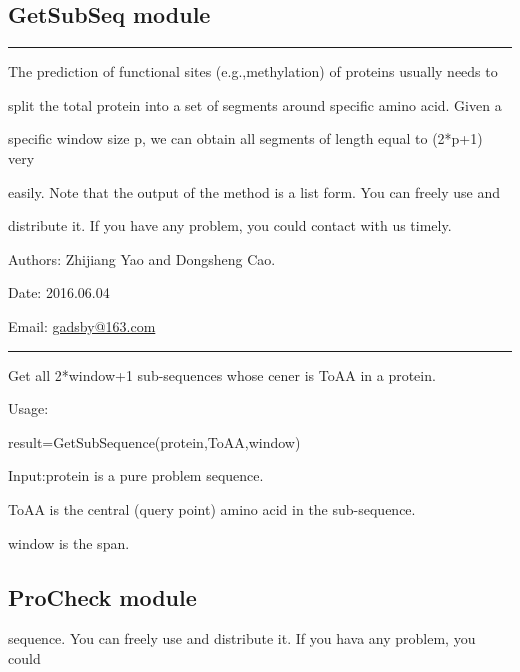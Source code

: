 \documentclass[letterpaper,10pt,english]{sphinxmanual}
\begin{document}
\subsection{GetSubSeq module}
\label{reference/GetSubSeq:module-GetSubSeq}\label{reference/GetSubSeq:getsubseq-module}\label{reference/GetSubSeq::doc}

\bigskip\hrule{}\bigskip


The prediction of functional sites (e.g.,methylation) of proteins usually needs to

split the total protein into a set of segments around specific amino acid. Given a

specific window size p, we can obtain all segments of length equal to (2*p+1) very

easily. Note that the output of the method is a list form. You can freely use and

distribute it. If you have any problem, you could contact with us timely.

Authors: Zhijiang Yao and Dongsheng Cao.

Date: 2016.06.04

Email: \href{mailto:gadsby@163.com}{gadsby@163.com}


\bigskip\hrule{}\bigskip


\begin{fulllineitems}
\label{reference/GetSubSeq:GetSubSeq.GetSubSequence}
Get all 2*window+1 sub-sequences whose cener is ToAA in a protein.

Usage:

result=GetSubSequence(protein,ToAA,window)

Input:protein is a pure problem sequence.

ToAA is the central (query point) amino acid in the sub-sequence.

window is the span.

\end{fulllineitems}



\subsection{ProCheck module}
\label{reference/ProCheck::doc}\label{reference/ProCheck:module-ProCheck}\label{reference/ProCheck:procheck-module}
sequence. You can freely use and distribute it. If you hava any problem, you could
\end{document}
